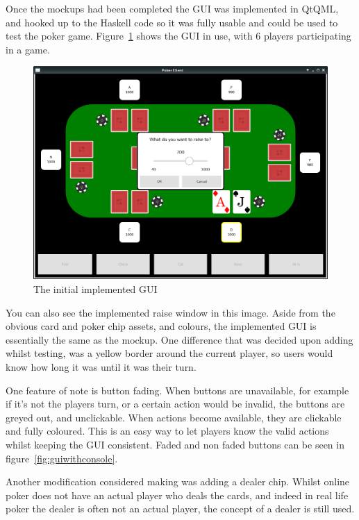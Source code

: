 Once the mockups had been completed the GUI was implemented in QtQML,
and hooked up to the Haskell code so it was fully usable and could be used
to test the poker game. Figure~\ref{fig:actualgui} shows the GUI in use,
with 6 players participating in a game. 

\begin{figure}[h]
    \centering
    \includegraphics[width=\textwidth]{../images/actualgui.png}
    \caption{The initial implemented GUI}%
    \label{fig:actualgui}
\end{figure}

You can also see the implemented raise window in this image. Aside from the 
obvious card and poker chip assets, and colours, the implemented GUI is 
essentially the same as the mockup. One difference that was decided upon 
adding whilst testing, was a yellow border around the current player, so users 
would know how long it was until it was their turn. 

One feature of note is button fading. When buttons are unavailable, for
example if it's not the players turn, or a certain action would be invalid,
the buttons are greyed out, and unclickable. When actions become available,
they are clickable and fully coloured. This is an easy way to let players
know the valid actions whilst keeping the GUI consistent. Faded and non faded
buttons can be seen in figure~\ref{fig:guiwithconsole}.

Another modification considered making was adding a dealer chip. Whilst
online poker does not have an actual player who deals the cards, and indeed
in real life poker the dealer is often not an actual player, the concept of
a dealer is still used.

